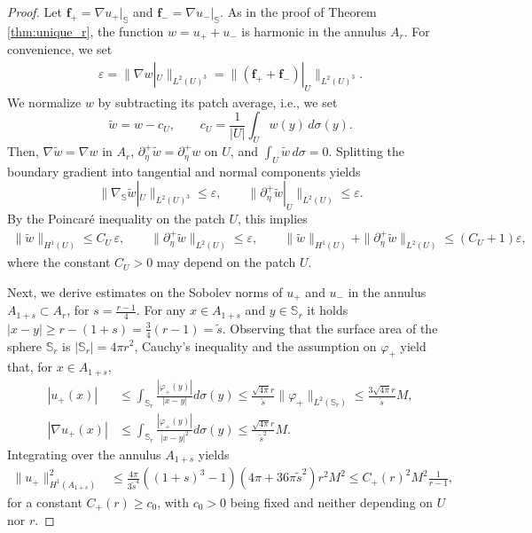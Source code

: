 \documentclass[a4paper, 11pt]{article}
\renewcommand{\SS}{\mathbb{S}}
\newcommand{\f}{\mathbf{f}}
\begin{document}
\begin{proof}
	Let $\f_+=\nabla u_+|_\SS$ and $\f_- =\nabla u_-|_\SS$. As in the proof of Theorem \ref{thm:unique_r}, the function $w=u_++u_-$ is harmonic in the annulus $A_r$. For convenience, we set
	\begin{align}
		\varepsilon=\|\nabla w|_U\|_{L^2(U)^3}=\|(\f_++\f_-)|_U\|_{L^2(U)^3}.
	\end{align}
	We normalize $w$ by subtracting its patch average, i.e., we set
	\[
		\widetilde w=w-c_U ,\qquad c_U=\frac{1}{|U|}\int_U w(y)\,d\sigma(y).
	\]
	Then, \(\nabla\widetilde w=\nabla w\) in \(A_r\), \(\partial_\eta^+\widetilde w=\partial_\eta^+w\) on \(U\), and \(\int_U\widetilde w\,d\sigma=0\). Splitting the boundary gradient into tangential and normal components yields
	\[
		\|\nabla_\SS \widetilde w|_U\|_{L^2(U)^3}\le \varepsilon,
		\qquad
		\|\partial_\eta^+ \widetilde w|_U\|_{L^2(U)}\le \varepsilon.
	\]
		By the Poincar\'e inequality on the patch \(U\), this implies
		\begin{align}
			\|\widetilde w\|_{H^1(U)}\le C_U\,\varepsilon,
			\qquad
			\|\partial_\eta^+ \widetilde w\|_{L^2(U)}\le \varepsilon, \qquad \|\widetilde w\|_{H^1(U)}+\|\partial_\eta^+\widetilde w\|_{L^2(U)}
		\le (C_U+1)\varepsilon ,\label{eqn:smallnessest}
		\end{align}
     where the constant $C_U>0$ may depend on the patch $U$.
    
    Next, we derive estimates on the Sobolev norms of $u_+$ and $u_-$ in the annulus $A_{1+s}\subset A_r$, for $s=\tfrac{r-1}{4}$. For any $x\in A_{1+s}$ and $y\in \SS_r$ it holds $|x-y|\geq r-(1+s)=\tfrac{3}{4}(r-1)=\tilde{s}$. Observing that the surface area of the sphere $\SS_r$ is $|\SS_r|=4\pi r^2$, Cauchy's inequality and the assumption on $\varphi_+$ yield that, for $x\in A_{1+s}$,
	\begin{align}
		|u_+(x)|&\leq \int_{\SS_r}\frac{|\varphi_+(y)|}{|x-y|}d\sigma(y)\leq \frac{\sqrt{4\pi} r}{\tilde s}\|\varphi_+\|_{L^2(\SS_r)}\leq \frac{3\sqrt{4\pi} r}{\tilde{s}} M,
		\\|\nabla u_+(x)|&\leq \int_{\SS_r}\frac{|\varphi_+(y)|}{|x-y|^2}d\sigma(y)\leq \frac{\sqrt{4\pi} r}{\tilde{s}^2} M.
	\end{align}
	Integrating over the annulus $A_{1+s}$ yields
    \begin{align}
			\|u_+\|_{H^1(A_{1+s})}^2&\leq \frac{4\pi}{3\tilde{s}^4}\left((1+s)^3-1\right)(4\pi+36\pi\tilde{s}^2)r^2M^2\leq C_+(r)^2M^2\frac{1}{r-1},\label{eqn:uplusest}
	\end{align}
    for a constant $C_+(r)\geq c_0$, with $c_0>0$ being fixed and neither depending on $U$ nor $r$.
    

\end{proof}
\end{document}
